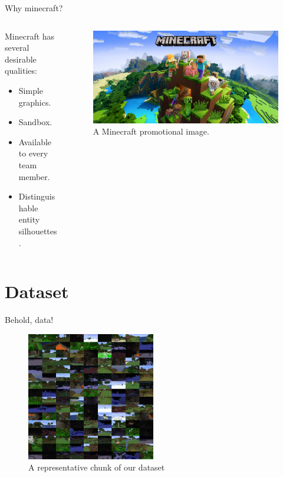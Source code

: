 \documentclass[english]{beamer}
\begin{document}
\begin{frame}{Why minecraft?}

  \begin{columns}
    
    \begin{column}{0.5\textwidth}
      Minecraft has several desirable qualities:
      \begin{itemize}
        \item Simple graphics.
        \item Sandbox.
        \item Available to every team member.
        \item Distinguishable entity silhouettes.
      \end{itemize}
    \end{column}

    \begin{column}{0.5\textwidth}
      \begin{figure}
        \centering
            \includegraphics[width=1.0\textwidth]{images/minecraft.jpg}
            \caption{A Minecraft promotional image.}
        \end{figure}
    \end{column}

  \end{columns}

\end{frame}

\section{Dataset}
\begin{frame}{Behold, data!}
  \begin{figure}[h]
      \centering
      \includegraphics[width=0.5\textwidth]{../images/dtset_repr.png}
      \caption{A representative chunk of our dataset}
  \end{figure}
\end{frame}
\end{document}
